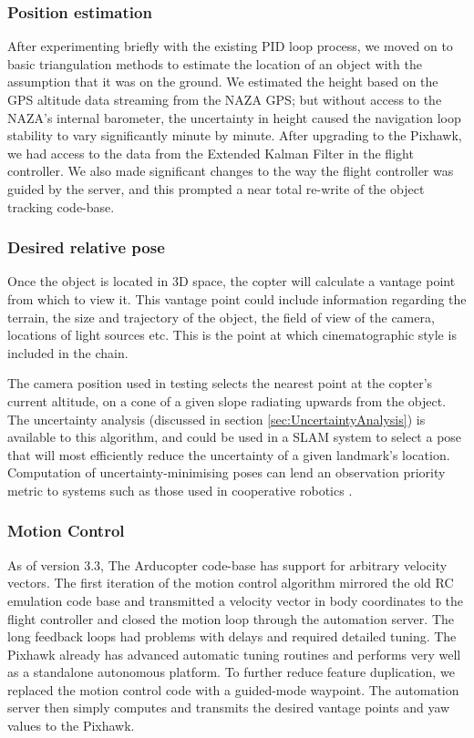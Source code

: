 \documentclass{article}
\begin{document}
    \subsubsection{Position estimation}
      After experimenting briefly with the existing PID loop process, we moved on to basic triangulation methods to estimate the location of an object with the assumption that it was on the ground.  We estimated the height based on the GPS altitude data streaming from the NAZA GPS; but without access to the NAZA's internal barometer, the uncertainty in height caused the navigation loop stability to vary significantly minute by minute.
      After upgrading to the Pixhawk, we had access to the data from the Extended Kalman Filter in the flight controller.  We also made significant changes to the way the flight controller was guided by the server, and this prompted a near total re-write of the object tracking code-base.

    \subsubsection{Desired relative pose}
      Once the object is located in 3D space, the copter will calculate a vantage point from which to view it.
      This vantage point could include information regarding the terrain, the size and trajectory of the object, the field of view of the camera, locations of light sources etc.  This is the point at which cinematographic style is included in the chain.

      The camera position used in testing selects the nearest point at the copter's current altitude, on a cone of a given slope radiating upwards from the object.
      The uncertainty analysis (discussed in section \ref{sec:UncertaintyAnalysis}) is available to this algorithm, and could be used in a SLAM system to select a pose that will most efficiently reduce the uncertainty of a given landmark's location.  Computation of uncertainty-minimising poses can lend an observation priority metric to systems such as those used in cooperative robotics \cite{TrilatUnderwater}.

    \subsubsection{Motion Control}
      As of version 3.3, The Arducopter code-base has support for arbitrary velocity vectors.  The first iteration of the motion control algorithm mirrored the old RC emulation code base and transmitted a velocity vector in body coordinates to the flight controller and closed the motion loop through the automation server.  The long feedback loops had problems with delays and required detailed tuning.
      The Pixhawk already has advanced automatic tuning routines and performs very well as a standalone autonomous platform.
      To further reduce feature duplication, we replaced the motion control code with a guided-mode waypoint.  The automation server then simply computes and transmits the desired vantage points and yaw values to the Pixhawk.
\end{document}
